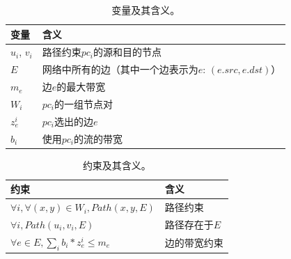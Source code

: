 \begin{table}[]
\begin{tabular}{l|l}
变量     & 含义                                                             \\ \hline
$u_i$, $v_i$ & 路径约束$pc_i$的源和目的节点                            \\ 
$E$          & 网络中所有的边（其中一个边表示为$e$: $(e.src, e.dst)$）                       \\
$m_e$        & 边$e$的最大带宽                                            \\
$W_i$        &  $pc_i$的一组节点对\\
$z^i_e$      &  $pc_i$选出的边$e$\\
$b_i$          & 使用$pc_i$的流的带宽                            
\end{tabular}
\caption{变量及其含义。}
\label{table:variables}
\end{table}


\begin{table}[]
\begin{tabular}{l|l}
约束                                        & 含义                               \\ \hline
$\forall i, \forall (x, y) \in W_i, Path(x, y, E)$                    & 路径约束                  \\
$\forall i, Path(u_i, v_i, E)$      & 路径存在于$E$     \\
$\forall e \in E, \sum_ib_i*z^i_e \le m_e$   & 边的带宽约束
\end{tabular}
\caption{约束及其含义。}
\label{table:constraints}
\end{table}

